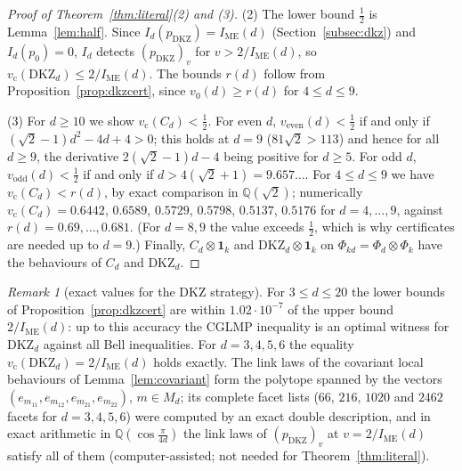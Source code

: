 \documentclass[11pt]{amsart}
\theoremstyle{definition}
\theoremstyle{remark}
\newtheorem{remark}[theorem]{Remark}
\numberwithin{equation}{section}
\newcommand{\IME}{I_{\mathrm{ME}}}
\newcommand{\one}{\mathbf{1}}
\newcommand{\Q}{\mathbb{Q}}
\newcommand{\vc}{v_{\mathrm c}}
\newcommand{\veven}{v_{\mathrm{even}}}
\newcommand{\vodd}{v_{\mathrm{odd}}}
\newcommand{\DKZ}{\mathrm{DKZ}}
\begin{document}
\begin{proof}[Proof of Theorem~\ref{thm:literal}(2) and (3)]
(2) The lower bound $\frac12$ is Lemma~\ref{lem:half}. Since $I_d(p_{\DKZ})=\IME(d)$ (Section~\ref{subsec:dkz}) and
$I_d(p_0)=0$, $I_d$ detects $(p_{\DKZ})_v$ for $v>2/\IME(d)$, so $\vc(\DKZ_d)\le2/\IME(d)$. The bounds $r(d)$ follow from
Proposition~\ref{prop:dkzcert}, since $v_0(d)\ge r(d)$ for $4\le d\le9$.

(3) For $d\ge10$ we show $\vc(C_d)<\frac12$. For even $d$, $\veven(d)<\frac12$ if and only if $(\sqrt2-1)d^2-4d+4>0$;
this holds at $d=9$ ($81\sqrt2>113$) and hence for all $d\ge9$, the derivative $2(\sqrt2-1)d-4$ being positive for
$d\ge5$. For odd $d$, $\vodd(d)<\frac12$ if and only if $d>4(\sqrt2+1)=9.657\ldots$. For $4\le d\le9$ we have
$\vc(C_d)<r(d)$, by exact comparison in $\Q(\sqrt2)$; numerically $\vc(C_d)=0.6442$, $0.6589$, $0.5729$, $0.5798$,
$0.5137$, $0.5176$ for $d=4,\dots,9$, against $r(d)=0.69,\dots,0.681$. (For $d=8,9$ the value exceeds $\frac12$, which is
why certificates are needed up to $d=9$.) Finally, $C_d\otimes\one_k$ and $\DKZ_d\otimes\one_k$ on
$\Phi_{kd}=\Phi_d\otimes\Phi_k$ have the behaviours of $C_d$ and $\DKZ_d$.
\end{proof}

\begin{remark}[exact values for the DKZ strategy]\label{rem:exactdkz}
For $3\le d\le20$ the lower bounds of Proposition~\ref{prop:dkzcert} are within $1.02\cdot10^{-7}$ of the upper bound
$2/\IME(d)$: up to this accuracy the CGLMP inequality is an optimal witness for $\DKZ_d$ against all Bell inequalities.
For $d=3,4,5,6$ the equality $\vc(\DKZ_d)=2/\IME(d)$ holds exactly. The link laws of the covariant local behaviours of
Lemma~\ref{lem:covariant} form the polytope spanned by the vectors $(e_{m_{11}},e_{m_{12}},e_{m_{21}},e_{m_{22}})$,
$m\in M_d$; its complete facet lists ($66$, $216$, $1020$ and $2462$ facets for $d=3,4,5,6$) were computed by an exact
double description, and in exact arithmetic in $\Q(\cos\frac\pi{4d})$ the link laws of $(p_{\DKZ})_v$ at
$v=2/\IME(d)$ satisfy all of them (computer-assisted; not needed for Theorem~\ref{thm:literal}).
\end{remark}
\end{document}

